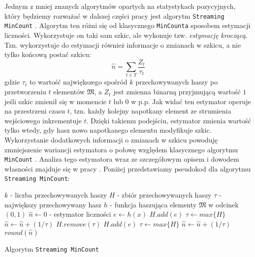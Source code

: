 Jednym z mniej znanych algorytmów opartych na statystykach pozycyjnych, który będziemy rozważać w dalszej części pracy jest algorytm \texttt{Streaming MinCount} \cite{streamed}. Algorytm ten różni się od klasycznego \texttt{MinCounta} sposobem estymacji liczności. Wykorzystuje on taki sam szkic, ale wykonuje tzw. \textit{estymację kroczącą}. Tzn. wykorzystuje do estymacji również informacje o zmianach w szkicu, a nie tylko końcową postać szkicu:
\begin{equation}
    \hat{n} = \sum_{t \in T} \frac{Z_t}{\tau_{t}}
\end{equation}
gdzie $\tau_{t}$ to wartość największego spośród $k$ przechowywanych haszy po przetworzeniu $t$ elementów $\mathfrak{M}$, a $Z_t$ jest zmienna binarną przyjmującą wartość $1$ jeśli szkic zmienił się w momencie $t$ lub $0$ w p.p. Jak widać ten estymator operuje na przestrzeni czasu $t$, tzn. każdy kolejny napotkany element ze strumienia wejściowego inkrementuje $t$. Dzięki takiemu podejściu, estymator zmienia wartość tylko wtedy, gdy hasz nowo napotkanego elementu modyfikuje szkic. Wykorzystanie dodatkowych informacji o zmianach w szkicu powoduję zmniejszenie wariancji estymatora o połowę względem klasycznego algorytmu \texttt{MinCount} \cite{ting}. Analiza tego estymatora wraz ze szczegółowym opisem i dowodem własności znajduje się w pracy \cite{streamed}. Poniżej przedstawiamy 
pseudokod dla algorytmu \texttt{Streaming MinCount}:
\newline
\begin{algorithm}
    \begin{algorithmic}
    \State $k $ - liczba przechowywanych haszy 
    \State $H  $ - zbiór przechowywanych haszy
    \State $\tau  $ - największy przechowywany hasz 
    \State $h  $ - funkcja haszująca elementy $\mathfrak{M}$ w odcinek $(0, 1)$
    \State $\hat{n} \gets 0$  - estymator liczności
    \newline
        \State $e \gets h(x)$
                \State $H.add(e)$
                \State $\tau \gets max\{H\}$
                \State $\hat{n} \gets \hat{n} + (1/\tau)$
                \State $H.remove(\tau)$
                \State $H.add(e)$
                \State $\tau \gets max\{H\}$
                \State $\hat{n} \gets \hat{n} + (1/\tau)$
            \EndIf
        \EndIf
    \EndFunction
    \newline
        \State \Return $round(\hat{n})$
    \EndFunction
    
    \end{algorithmic}
    \caption{Algorytm \texttt{Streaming MinCount}}
\end{algorithm}

